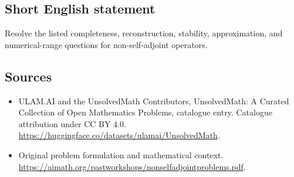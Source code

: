 \documentclass[11pt]{article}
\begin{document}
\subsection{Short English statement}
Resolve the listed completeness, reconstruction, stability, approximation, and numerical-range questions for non-self-adjoint operators.
\subsection{Sources}
\begin{itemize}
\item[\hypertarget{source:statement:1}{S1}] ULAM.AI and the UnsolvedMath Contributors, UnsolvedMath: A Curated Collection of Open Mathematics Problems, catalogue entry. Catalogue attribution under CC BY 4.0.
\url{https://huggingface.co/datasets/ulamai/UnsolvedMath}.
\item[\hypertarget{source:statement:2}{S2}] Original problem formulation and mathematical context.
\url{https://aimath.org/pastworkshops/nonselfadjointproblems.pdf}.
\end{itemize}
\label{end:statement}
\end{document}
